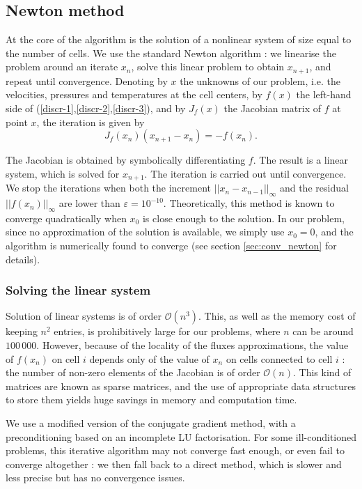 \documentclass[12pt]{article}
\begin{document}
\subsection{Newton method}
At the core of the algorithm is the solution of a nonlinear system of
size equal to the number of cells. We use the standard Newton
algorithm : we linearise the problem around an iterate $x_n$, solve
this linear problem to obtain $x_{n+1}$, and repeat until
convergence. Denoting by $x$ the unknowns of our problem, i.e. the
velocities, pressures and temperatures at the cell centers, by $f(x)$
the left-hand side of (\ref{discr-1},\ref{discr-2},\ref{discr-3}), and
by $J_f(x)$ the Jacobian matrix of $f$ at point $x$, the iteration is
given by
\begin{equation}
  \label{eq:newton}
  J_f(x_n) (x_{n+1} - x_n) = - f(x_n).
\end{equation}

The Jacobian is obtained by symbolically differentiating $f$. The
result is a linear system, which is solved for $x_{n+1}$. The iteration
is carried out until convergence. We stop the iterations when both the
increment $||x_{n} - x_{n-1}||_\infty$ and the residual
$||f(x_n)||_\infty$ are lower than $\varepsilon =
10^{-10}$. Theoretically, this method is known to converge
quadratically when $x_0$ is close enough to the solution. In our problem,
since no approximation of the solution is available, we simply use
$x_0 = 0$, and the algorithm is numerically found to converge (see
section \ref{sec:conv_newton} for details).

\subsubsection{Solving the linear system}
Solution of linear systems is of order $\mathcal O (n^3)$. This, as
well as the memory cost of keeping $n^2$ entries, is prohibitively
large for our problems, where $n$ can be around $100\,000$. However,
because of the locality of the fluxes approximations, the value of
$f(x_n)$ on cell $i$ depends only of the value of $x_n$ on cells
connected to cell $i$ : the number of non-zero elements of the
Jacobian is of order $\mathcal O (n)$. This kind of matrices are known
as sparse matrices, and the use of appropriate data structures to
store them yields huge savings in memory and computation time.

We use a modified version of the conjugate gradient method, with a
preconditioning based on an incomplete LU factorisation. For some
ill-conditioned problems, this iterative algorithm may not converge
fast enough, or even fail to converge altogether : we then fall back
to a direct method, which is slower and less precise but has no
convergence issues.
\end{document}
